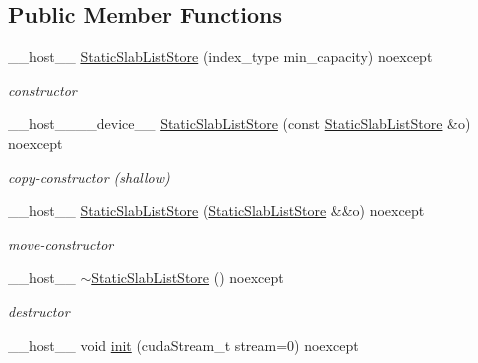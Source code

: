 \subsection*{Public Member Functions}
\begin{DoxyCompactItemize}
\item 
\+\_\+\+\_\+host\+\_\+\+\_\+ \hyperlink{classwarpcore_1_1storage_1_1multi__value_1_1StaticSlabListStore_a7e7a89e7aec237c5cf8a400721f7b35e}{Static\+Slab\+List\+Store} (index\+\_\+type min\+\_\+capacity) noexcept
\begin{DoxyCompactList}\small\item\em constructor \end{DoxyCompactList}\item 
\+\_\+\+\_\+host\+\_\+\+\_\+\+\_\+\+\_\+device\+\_\+\+\_\+ \hyperlink{classwarpcore_1_1storage_1_1multi__value_1_1StaticSlabListStore_ab235c074c6c6349f56513719376ce09e}{Static\+Slab\+List\+Store} (const \hyperlink{classwarpcore_1_1storage_1_1multi__value_1_1StaticSlabListStore}{Static\+Slab\+List\+Store} \&o) noexcept
\begin{DoxyCompactList}\small\item\em copy-\/constructor (shallow) \end{DoxyCompactList}\item 
\+\_\+\+\_\+host\+\_\+\+\_\+ \hyperlink{classwarpcore_1_1storage_1_1multi__value_1_1StaticSlabListStore_ab8715de6b28b9e67e4fb69cde5a91cff}{Static\+Slab\+List\+Store} (\hyperlink{classwarpcore_1_1storage_1_1multi__value_1_1StaticSlabListStore}{Static\+Slab\+List\+Store} \&\&o) noexcept
\begin{DoxyCompactList}\small\item\em move-\/constructor \end{DoxyCompactList}\item 
\mbox{\label{classwarpcore_1_1storage_1_1multi__value_1_1StaticSlabListStore_a1c01290b1fadcf819d86e63138c869d9}} 
\+\_\+\+\_\+host\+\_\+\+\_\+ \hyperlink{classwarpcore_1_1storage_1_1multi__value_1_1StaticSlabListStore_a1c01290b1fadcf819d86e63138c869d9}{$\sim$\+Static\+Slab\+List\+Store} () noexcept
\begin{DoxyCompactList}\small\item\em destructor \end{DoxyCompactList}\item 
\+\_\+\+\_\+host\+\_\+\+\_\+ void \hyperlink{classwarpcore_1_1storage_1_1multi__value_1_1StaticSlabListStore_a804e1993c67dc70854627e9b16a194e8}{init} (cuda\+Stream\+\_\+t stream=0) noexcept

\end{DoxyCompactItemize}
